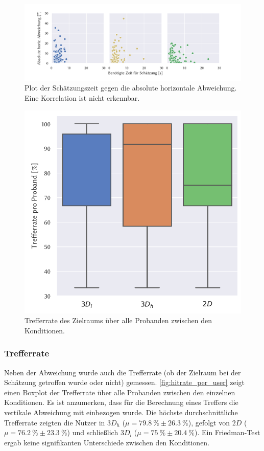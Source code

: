\begin{figure}[p]
    \centering
    \includegraphics[trim={1.2cm, 0.5cm, 2cm, 0.5cm}, clip, width=\linewidth]{figures/analysis/pointing_time_vs_error}
    \caption{Plot der Schätzungszeit gegen die absolute horizontale Abweichung. %
    Eine Korrelation ist nicht erkennbar.}
    \label{fig:pointing_time_vs_error}
\end{figure}
\begin{figure}[p]
    \centering
    \includegraphics[width=0.75\linewidth]{figures/analysis/hitrate_per_user}
    \caption{Trefferrate des Zielraums über alle Probanden zwischen den Konditionen.}
    \label{fig:hitrate_per_user}
\end{figure}

\subsubsection*{Trefferrate}
Neben der Abweichung wurde auch die Trefferrate (ob der Zielraum bei der Schätzung getroffen wurde oder nicht) gemessen.
\autoref{fig:hitrate_per_user} zeigt einen Boxplot der Trefferrate über alle Probanden zwischen den einzelnen Konditionen.
Es ist anzumerken, dass für die Berechnung eines Treffers die vertikale Abweichung mit einbezogen wurde.
Die höchste durchschnittliche Trefferrate zeigten die Nutzer in $3D_h$ ($\mu = \SI{79,8}{\percent} \pm \SI{26,3}{\percent}$), gefolgt von $2D$ ($\mu = \SI{76,2}{\percent} \pm \SI{23,3}{\percent}$) und schließlich $3D_l$ ($\mu = \SI{75}{\percent} \pm \SI{20,4}{\percent}$).
Ein Friedman-Test ergab keine signifikanten Unterschiede zwischen den Konditionen.

